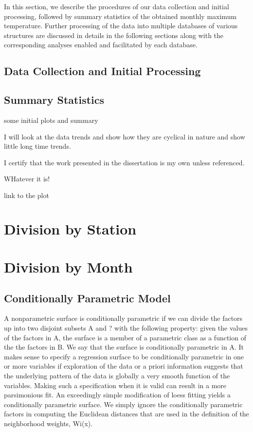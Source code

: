 In this section, we describe the procedures of our data collection and initial 
processing, followed by summary statistics of the obtained monthly maximum 
temperature. Further processing of the data into multiple databases of various 
structures are discussed in details in the following sections along with the 
corresponding analyses enabled and facilitated by each database.

\subsection{Data Collection and Initial Processing}

\subsection{Summary Statistics}
some initial plots and summary

I will look at the data trends and show how they are cyclical in nature and show little long time trends.

\begin{myframe}[width=\textwidth, bottom=28pt, top=20pt]
I certify that the work presented in the dissertation is my own unless referenced.

WHatever it is!

link to the plot
\end{myframe}

\section{Division by Station}


\section{Division by Month}

\subsection{Conditionally Parametric Model}

A nonparametric surface is conditionally
parametric if we can divide the factors up into two disjoint subsets
A and ? with the following property: given the values of the factors in A,
the surface is a member of a parametric class as a function of the the factors
in B. We say that the surface is conditionally parametric in A.
It makes sense to specify a regression surface to be conditionally parametric
in one or more variables if exploration of the data or a priori information
suggests that the underlying pattern of the data is globally a very smooth
function of the variables. Making such a specification when it is valid can
result in a more parsimonious fit.
An exceedingly simple modification of loess fitting yields a conditionally
parametric surface. We simply ignore the conditionally parametric factors
in computing the Euclidean distances that are used in the definition of the
neighborhood weights, Wi(x).

